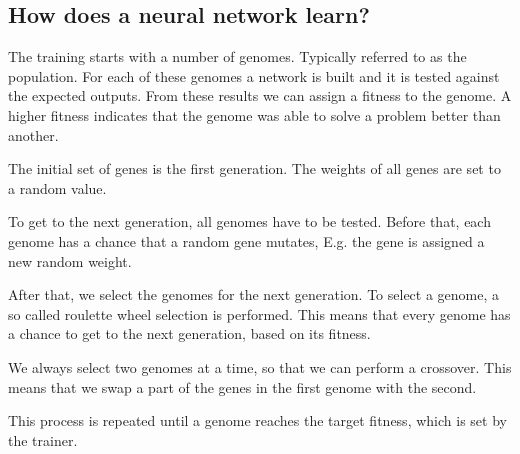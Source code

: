 \subsection{How does a neural network learn?}

The training starts with a number of genomes. Typically referred to as the population. For each of these genomes a network is built and it is tested against the expected outputs. From these results we can assign a fitness to the genome. A higher fitness indicates that the genome was able to solve a problem better than another. \cite{Anderson1995}

The initial set of genes is the first generation. The weights of all genes are set to a random value.

To get to the next generation, all genomes have to be tested. Before that, each genome has a chance that a random gene mutates, E.g. the gene is assigned a new random weight.

After that, we select the genomes for the next generation. To select a genome, a so called roulette wheel selection is performed. This means that every genome has a chance to get to the next generation, based on its fitness. \cite{Baeck1996}

We always select two genomes at a time, so that we can perform a crossover. This means that we swap a part of the genes in the first genome with the second. \cite{Buckland}

This process is repeated until a genome reaches the target fitness, which is set by the trainer.
